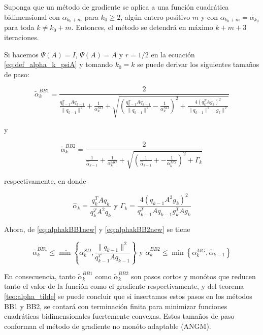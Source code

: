 \begin{corollary}
    Suponga que un método de gradiente se aplica a una función cuadrática bidimensional con $\alpha_{k_0+m}$ para $k_0\geq 2$, algún entero positivo $m$ y con $\alpha_{k_0+m}= \tilde{\alpha_{k_0}}$ para toda $k\neq k_0+m$. Entonces, el método se detendrá en máximo $k+m+3$ iteraciones.
\end{corollary}

Si hacemos $\Psi(A)= I$, $\Psi(A)= A$ y $r=1/2$ en la ecuación \ref{eq:def_alpha_k_psiA} y tomando $k_0=k$ se puede derivar los siguientes tamaños de paso:

\begin{equation}
    \tilde{\alpha}_k^{BB1} = \frac{2}{\frac{q_{k-1}^TAq_{k-1}}{\|q_{k-1}\|^2} + \frac{1}{\alpha_k^{SD}}+\sqrt{ \left(\frac{q_{k-1}^TAq_{k-1}}{\|q_{k-1}\|^2} -\frac{1}{\alpha_{k}^{SD}} \right)^2 + \frac{4\left(q_k^TAg_k\right)^2}{\|q_{k-1}\|^2\|g_k\|^2} }}
    \label{eq:alphakBB1new}
\end{equation}

y

\begin{equation}
    \tilde{\alpha}_k^{BB2} = \frac{2}{\frac{1}{\hat{\alpha}_{k-1}} +\frac{1}{\alpha_k^{MG}} + \sqrt{\left( \frac{1}{\hat{\alpha}_{k-1}}+ - \frac{1}{\alpha_k^{MG}}  \right) ^2 + \Gamma_k} }
    \label{eq:alphakBB2new}
\end{equation}

respectivamente, en donde

\begin{equation}
    \hat{\alpha}_k = \frac{q_k^TAq_k}{q_k^TA^2q_k} \text{ \ y \ } \Gamma_k = \frac{4\left(q_{k-1}A^2g_k\right)^2}{q_{k-1}^TAq_{k-1}g_k^TAg_k}
\end{equation}

Ahora, de \ref{eq:alphakBB1new} y \ref{eq:alphakBB2new} se tiene

\begin{equation}
    \tilde{\alpha}_k^{BB1}\leq\min{\left\{\alpha_k^{SD}, \frac{\|q_{k-1}\|^2}{q_{k-1}^{T}Aq_{k-1}}\right\}} \text{ \ y \ } \tilde{\alpha}_k^{BB2}\leq \min{\left\{\alpha_k^{MG}, \hat{\alpha}_{k-1}\right\}} \label{eq:alphabounds}
\end{equation}

En consecuencia, tanto $\tilde{\alpha}_k^{BB1}$ como $\tilde{\alpha}_k^{BB2}$ son pasos cortos y monótos que reducen tanto el valor de la función como el gradiente respectivamente, y del teorema \ref{teo:alpha_tilde} se puede concluir que si insertamos estos pasos en los métodos BB1 y BB2, se contará con terminación finita para minimizar funciones cuadráticas bidimensionales fuertemente convexas. Estos tamaños de paso conforman el método de gradiente no monóto adaptable (ANGM).

